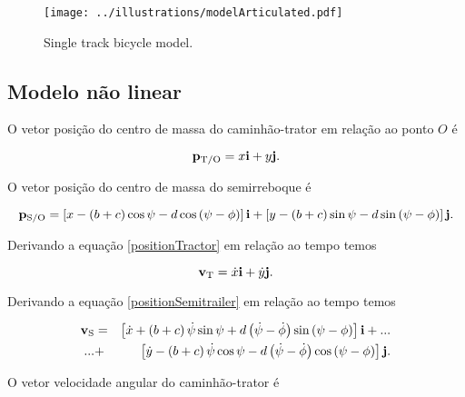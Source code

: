 \documentclass[sublist]{fei}
\begin{document}
\begin{figure}
    \begin{center}
    \texttt{[image: ../illustrations/modelArticulated.pdf]}
    \caption{Single track bicycle model.} \label{modelSimple}
    \end{center}
\end{figure}

\subsection{Modelo não linear}

O vetor posição do centro de massa do caminhão-trator em relação ao ponto \(O\) é

\begin{equation} \label{positionTractor}
    {\bf p}_{{\rm T}/{\rm O}} = x {\bf i} + y {\bf j}.
\end{equation}

O vetor posição do centro de massa do semirreboque é

\begin{equation} \label{positionSemitrailer}
    {\bf p}_{{\rm S}/{\rm O}} = \left[ x - \left( b + c \right) \cos \psi - d \cos \left( \psi - \phi \right) \right] {\bf i} + \left[ y - \left( b + c \right) \sin \psi - d \sin \left( \psi - \phi \right) \right] {\bf j}.
\end{equation}

Derivando a equação \eqref{positionTractor} em relação ao tempo temos

\begin{equation} \label{velocityTractor}
    {\bf v}_{\rm T} = \dot{x} {\bf i} + \dot{y} {\bf j}.
\end{equation}

Derivando a equação \eqref{positionSemitrailer} em relação ao tempo temos

\begin{eqnarray} \label{velocitySemitrailer}
    \nonumber
    {\bf v}_{\rm S} &=& \left[ \dot{x} + \left( b + c \right) \dot{\psi} \sin \psi + d \left( \dot{\psi} - \dot{\phi} \right) \sin \left( \psi - \phi \right) \right] {\bf i} + ... \\
    \nonumber
     ... &+& \left[ \dot{y} - \left( b + c \right) \dot{\psi} \cos \psi - d \left( \dot{\psi} - \dot{\phi} \right) \cos \left( \psi - \phi \right) \right] {\bf j}. \\
\end{eqnarray}


O vetor velocidade angular do caminhão-trator é
\end{document}
